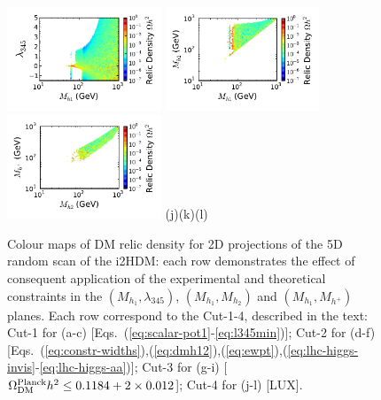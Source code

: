 \documentclass[12pt,a4paper]{article}
\begin{document}
\begin{figure}[htb]
\vskip 0.0cm
{\hspace*{-0.3cm}\includegraphics[width=0.41\textwidth]{Mh1_ld345_Omega_large-cut12345678.pdf}}%
{\hspace*{-1.78cm}\includegraphics[width=0.41\textwidth]{Mh1_Mh2_Omega_large-cut12345678.pdf}}%
{\hspace*{-1.77cm}\includegraphics[width=0.41\textwidth]{Mhc_Mh2_Omega_large-cut12345678.pdf}}%
\vskip -1.05cm
\hspace*{1.2cm}(j)\hspace*{0.35\textwidth}\hspace*{-1.3cm}(k)\hspace*{0.35\textwidth}\hspace*{-1.2cm}(l)
\caption{Colour maps of DM relic density for 2D projections of the 5D random scan of the i2HDM:  
each row demonstrates the effect of consequent application
of the experimental and theoretical constraints in the $(M_{h_1},\lambda_{345})$, $(M_{h_1},M_{h_2})$ and 
$(M_{h_1},M_{h^{+}})$ planes. Each row correspond to the Cut-1-4, described in the text: Cut-1 for (a-c) [Eqs.~(\ref{eq:scalar-pot1}-\ref{eq:l345min})]; Cut-2 for (d-f) [Eqs.~(\ref{eq:constr-widths}),(\ref{eq:dmh12}),(\ref{eq:ewpt}),(\ref{eq:lhc-higgs-invis}-\ref{eq:lhc-higgs-aa})]; Cut-3 for (g-i) [$\Omega_{\rm DM}^{\rm Planck} h^2 \le 0.1184+2\times 0.012$]; Cut-4 for (j-l) [LUX].
%
\label{fig:dm-i2hdm}} 
\end{figure}
%
%
%
\end{document}
